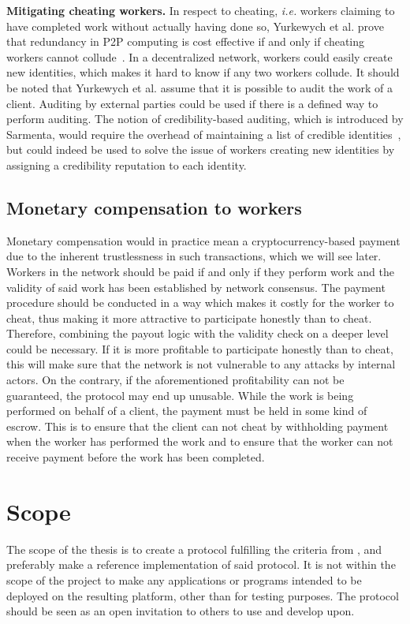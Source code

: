 \textbf{Mitigating cheating workers.}
In respect to cheating, \textit{i.e.} workers claiming to have completed work without actually having done so, Yurkewych et al. prove that redundancy in P2P computing is cost effective if and only if cheating workers cannot collude~\cite{yurkewych:2005}. In a decentralized network, workers could easily create new identities, which makes it hard to know if any two workers collude. It should be noted that Yurkewych et al. assume that it is possible to audit the work of a client. Auditing by external parties could be used if there is a defined way to perform auditing. The notion of credibility-based auditing, which is introduced by Sarmenta, would require the overhead of maintaining a list of credible identities~\cite{sarmenta:2002}, but could indeed be used to solve the issue of workers creating new identities by assigning a credibility reputation to each identity.

\subsection{Monetary compensation to workers}
\label{sec:prob:compensation}
Monetary compensation would in practice mean a cryptocurrency-based payment due to the inherent trustlessness in such transactions, which we will see later. Workers in the network should be paid if and only if they perform work and the validity of said work has been established by network consensus. The payment procedure should be conducted in a way which makes it costly for the worker to cheat, thus making it more attractive to participate honestly than to cheat. Therefore, combining the payout logic with the validity check on a deeper level could be necessary. If it is more profitable to participate honestly than to cheat, this will make sure that the network is not vulnerable to any attacks by internal actors. On the contrary, if the aforementioned profitability can not be guaranteed, the protocol may end up unusable. While the work is being performed on behalf of a client, the payment must be held in some kind of escrow. This is to ensure that the client can not cheat by withholding payment when the worker has performed the work and to ensure that the worker can not receive payment before the work has been completed.

\section{Scope}
The scope of the thesis is to create a protocol fulfilling the criteria from , and preferably make a reference implementation of said protocol. It is not within the scope of the project to make any applications or programs intended to be deployed on the resulting platform, other than for testing purposes. The protocol should be seen as an open invitation to others to use and develop upon.

